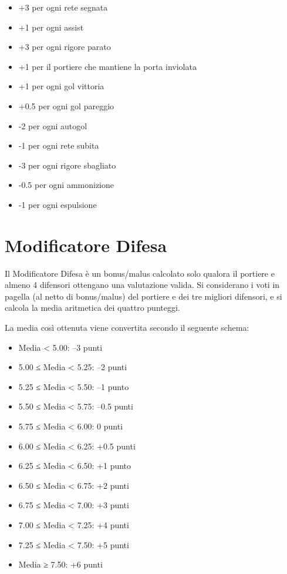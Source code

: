 \begin{itemize}
    \item +3 per ogni rete segnata
    \item +1 per ogni assist
    \item +3 per ogni rigore parato
    \item +1 per il portiere che mantiene la porta inviolata
    \item +1 per ogni gol vittoria
    \item +0.5 per ogni gol pareggio
    \item -2 per ogni autogol
    \item -1 per ogni rete subita
    \item -3 per ogni rigore sbagliato
    \item -0.5 per ogni ammonizione
    \item -1 per ogni espulsione
\end{itemize}

\section{Modificatore Difesa}
\label{art:5.4}

Il Modificatore Difesa è un bonus/malus calcolato solo qualora il portiere e almeno 4 difensori ottengano una valutazione valida. Si considerano i voti in pagella (al netto di bonus/malus) del portiere e dei tre migliori difensori, e si calcola la media aritmetica dei quattro punteggi.

La media così ottenuta viene convertita secondo il seguente schema:

\begin{itemize}
    \item Media < 5.00: –3 punti
    \item 5.00 ≤ Media < 5.25: –2 punti
    \item 5.25 ≤ Media < 5.50: –1 punto
    \item 5.50 ≤ Media < 5.75: –0.5 punti
    \item 5.75 ≤ Media < 6.00: 0 punti
    \item 6.00 ≤ Media < 6.25: +0.5 punti
    \item 6.25 ≤ Media < 6.50: +1 punto
    \item 6.50 ≤ Media < 6.75: +2 punti
    \item 6.75 ≤ Media < 7.00: +3 punti
    \item 7.00 ≤ Media < 7.25: +4 punti
    \item 7.25 ≤ Media < 7.50: +5 punti
    \item Media ≥ 7.50: +6 punti
\end{itemize}

